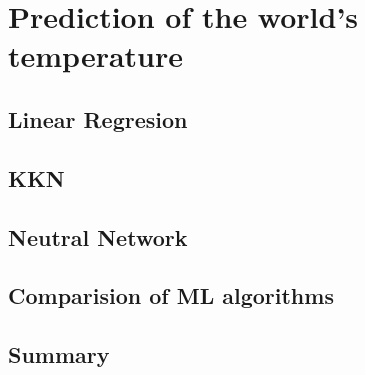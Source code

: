 \chapter{Prediction of the world's temperature}

\section{Linear Regresion}

\section{KKN}

\section{Neutral Network}

\section{Comparision of ML algorithms}

\section{Summary}
